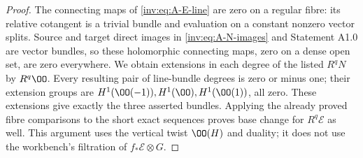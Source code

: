 \begin{proof}
The connecting maps of \eqref{inv:eq:A-E-line} are zero on a regular
fibre: its relative cotangent is a trivial bundle and evaluation on
a constant nonzero vector splits.  Source and target direct images
in \eqref{inv:eq:A-N-images} and Statement A1.0 are vector bundles,
so these holomorphic connecting maps, zero on a dense open set, are
zero everywhere.  We obtain extensions in each degree of the listed
$R^qN$ by $R^q\OO$.  Every resulting pair of line-bundle degrees is
zero or minus one; their extension groups are
$H^1(\OO(-1)),H^1(\OO),H^1(\OO(1))$, all zero.  These extensions
give exactly the three asserted bundles.  Applying the already proved
fibre comparisons to the short exact sequences proves base change
for $R^q\mathcal E$ as well.  This argument uses the vertical twist
$\OO(H)$ and duality; it does not use the workbench's filtration of
$f_*\mathcal E\otimes G$.
\end{proof}

